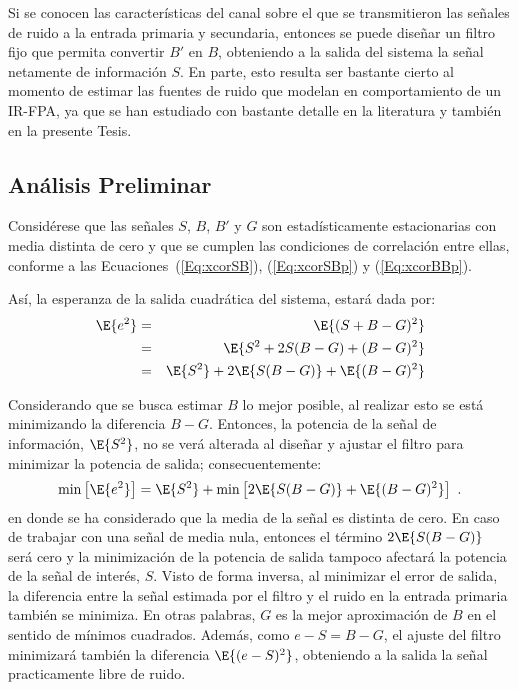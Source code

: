 Si se conocen las características del canal sobre el que se transmitieron las señales de ruido a la entrada primaria y secundaria, entonces se puede diseñar un filtro fijo que permita convertir $B'$ en $B$, obteniendo a la salida del sistema la señal netamente de información $S$. En parte, esto resulta ser bastante cierto al momento de estimar las fuentes de ruido que modelan en comportamiento de un \ac{IR}-\ac{FPA}, ya que se han estudiado con bastante detalle en la literatura y también en la presente Tesis. %


\subsection{Análisis Preliminar}
Considérese que las señales $S$, $B$, $B'$ y $G$ son estadísticamente estacionarias con media distinta de cero y que se cumplen las condiciones de correlación entre ellas, conforme a las Ecuaciones~(\ref{Eq:xcorSB}), (\ref{Eq:xcorSBp}) y (\ref{Eq:xcorBBp}).

Así, la esperanza de la salida cuadrática del sistema, estará dada por:
\begin{eqnarray}\nonumber
 \E{e^2} &=& \E{(S + B - G)^2}\\\nonumber
 &=& \E{S^2 + 2S(B-G) + (B-G)^2}\\
 &=& \E{S^2} + 2\E{S(B-G)} + \E{(B-G)^2}\label{Eq:OutputExpectation}
\end{eqnarray}

Considerando que se busca estimar $B$ lo mejor posible, al realizar esto se está minimizando la diferencia $B-G$. Entonces, la potencia de la señal de información, $\E{S^2}$, no se verá alterada al diseñar y ajustar el filtro para minimizar la potencia de salida; consecuentemente:
\begin{equation}
 \min\left[\E{e^2}\right] = \E{S^2} + \min\left[2\E{S(B-G)} + \E{(B-G)^2}\right]~.
\end{equation}
en donde se ha considerado que la media de la señal es distinta de cero. En caso de trabajar con una señal de media nula, entonces el término $2\E{S(B-G)}$ será cero y la minimización de la potencia de salida tampoco afectará la potencia de la señal de interés, $S$. Visto de forma inversa, al minimizar el error de salida, la diferencia entre la señal estimada por el filtro y el ruido en la entrada primaria también se minimiza. En otras palabras, $G$ es la mejor aproximación de $B$ en el sentido de mínimos cuadrados. Además, como $e-S = B-G$, el ajuste del filtro minimizará también la diferencia $\E{(e - S)^2}$, obteniendo a la salida la señal practicamente libre de ruido.

